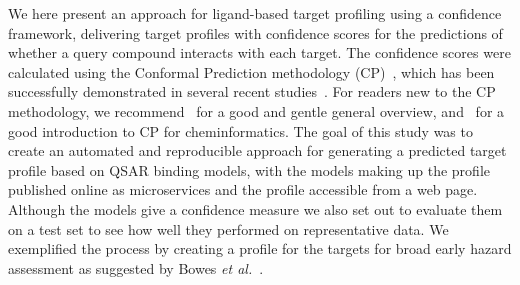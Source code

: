 \documentclass[utf8]{frontiersSCNS} %
\begin{document}
We here present an approach for ligand-based target profiling using a
confidence framework, delivering target profiles with confidence scores for
the predictions of whether a query compound interacts with each target. The
confidence scores were calculated using the Conformal Prediction methodology
(CP)~\cite{Vovk2005}, which has been successfully demonstrated in several
recent
studies~\cite{Cortes-Ciriano:2015ec,Norinder:2014fe,Forreryd:2018kb,Norinder:2016qf}.
For readers new to the CP methodology, we recommend~\cite{Gammerman2007} for
a good and gentle general overview, and~\cite{Norinder:2014fe} for a good
introduction to CP for cheminformatics.
%
The goal of this study was to create an automated and reproducible approach for
generating a predicted target profile based on QSAR binding models, with the models
making up the profile published online as microservices and the profile
accessible from a web page. Although the models give a confidence measure we
also set out to evaluate them on a test set to see how well they performed on
representative data. We exemplified the process by creating a profile for the
targets for broad early hazard assessment as suggested by Bowes \textit{et
al.}~\cite{Bowes2012}.
\end{document}
